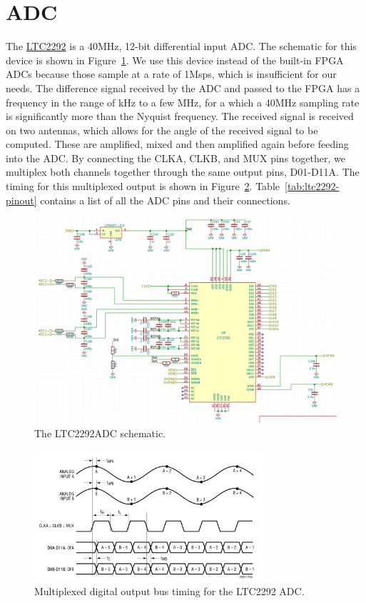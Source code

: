 \section{ADC}

The \href{http://www.analog.com/media/en/technical-documentation/data-sheets/229321fa.pdf}{LTC2292}
is a 40MHz, 12-bit differential input ADC. The schematic for this device is shown in
Figure~\ref{fig:ltc2292-schematic}. We use this device instead of the built-in FPGA ADCs
because those sample at a rate of 1Msps, which is insufficient for our needs. The difference signal
received by the ADC and passed to the FPGA has a frequency in the range of kHz to a few MHz, for a
which a 40MHz sampling rate is significantly more than the Nyquist frequency. The received signal
is received on two antennas, which allows for the angle of the received signal to be computed. These
are amplified, mixed and then amplified again before feeding into the ADC. By connecting the CLKA,
CLKB, and MUX pins together, we multiplex both channels together through the same output pins,
D01-D11A. The timing for this multiplexed output is shown in
Figure~\ref{fig:ltc2292-multiplex}. Table~\ref{tab:ltc2292-pinout} contains a list of all the ADC
pins and their connections.

\begin{figure}[h]
  \centering
  \includegraphics[width=\textwidth]{data/ltc2292-schematic.png}
  \caption{The LTC2292ADC schematic.}
  \label{fig:ltc2292-schematic}
\end{figure}

\begin{figure}[h]
  \centering\includegraphics[width=0.75\textwidth]{data/LTC2292-multiplex.png}
  \caption{Multiplexed digital output bus timing for the LTC2292 ADC.}
  \label{fig:ltc2292-multiplex}
\end{figure}

